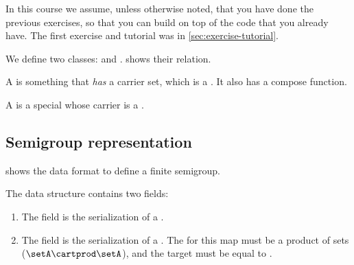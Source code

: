 
\begin{remark}
    In this course we assume, unless otherwise noted, that you have done the previous exercises, so that you can build on top of the code that you already have.
    The first exercise and tutorial was in \cref{sec:exercise-tutorial}.
\end{remark}

\begin{figure*}[b]
    \caption{}
    \label{fig:uml_semigroup}
\end{figure*}

We define two classes: \Semigroup and \FiniteSemigroup.
 shows their relation.

A \Semigroup is something that \emph{has} a carrier set, which is a \Setoid.
It also has a compose function.


A \FiniteSemigroup is a special \Semigroup whose carrier is a \FiniteSet.


\vfill\clearpage

\subsection{Semigroup representation}

\begin{marginfigure}%
    \caption{}%
    \label{fig:sm_min3}%
\end{marginfigure}%

 shows the data format to define a finite semigroup.

The data structure contains two fields:
\begin{enumerate}
    \item The field  is the serialization of a \FiniteSet \setA.
    \item The field  is the serialization of a \FiniteMap.
          The  for this map must be a product of sets ($\setA \cartprod \setA$), and the target must be equal to \setA.
\end{enumerate}


